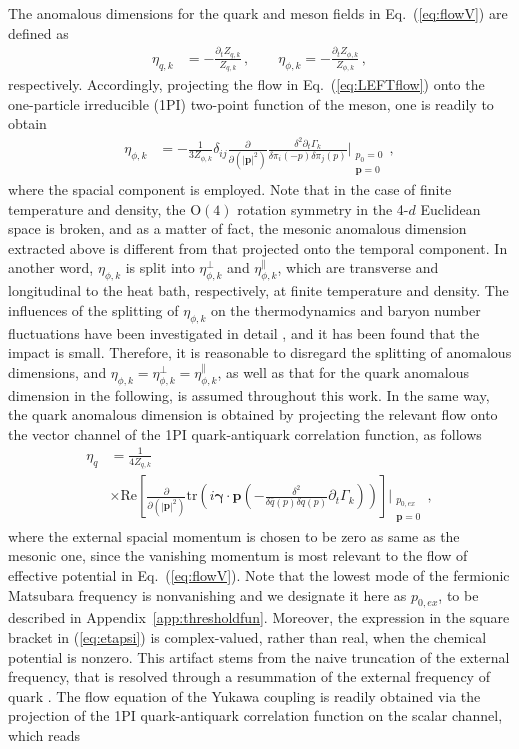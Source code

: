 \documentclass[%
reprint,
superscriptaddress,
showpacs,preprintnumbers,
 amsmath,amssymb,
 aps,
prd,
]{revtex4-1}
\def\Eq#1{Eq.~(\ref{#1})}
\def\eq#1{(\ref{#1})}
\def\app#1{Appendix~\ref{#1}}
\begin{document}
The anomalous dimensions for the quark and meson fields in \Eq{eq:flowV} are defined as
\begin{align}
 \eta_{q,k}&=-\frac{\partial_t Z_{q,k}}{Z_{q,k}}\,,\qquad
  \eta_{\phi,k}=-\frac{\partial_t Z_{\phi,k}}{Z_{\phi,k}}\,,
\end{align}
respectively. Accordingly, projecting the flow in \Eq{eq:LEFTflow} onto the one-particle irreducible (1PI) two-point function of the meson, one is readily to obtain 
\begin{align}
  \eta_{\phi,k}&=-\frac{1}{3Z_{\phi,k}}\delta_{ij}\frac{\partial}{\partial (|\bm{p}|^2)}\frac{\delta^2 \partial_t \Gamma_k}{\delta \pi_i(-p) \delta \pi_j(p)}\Bigg|_{\substack{p_0=0\\ \bm{p}=0}}\,,\label{eq:etaphi}
\end{align}
where the spacial component is employed. Note that in the case of finite temperature and density, the $\mathrm{O}(4)$ rotation symmetry in the 4-$d$ Euclidean space is broken, and as a matter of fact, the mesonic anomalous dimension extracted above is different from that projected onto the temporal component. In another word, $\eta_{\phi,k}$ is split into $\eta_{\phi,k}^{\perp}$ and $\eta_{\phi,k}^{\parallel}$, which are transverse and longitudinal to the heat bath, respectively, at finite temperature and density. The influences of the splitting of $\eta_{\phi,k}$ on the thermodynamics and baryon number fluctuations have been investigated in detail \cite{Yin:2019ebz}, and it has been found that the impact is small. Therefore, it is reasonable to disregard the splitting of anomalous dimensions, and $\eta_{\phi,k}=\eta_{\phi,k}^{\perp}=\eta_{\phi,k}^{\parallel}$, as well as that for the quark anomalous dimension in the following, is assumed throughout this work. In the same way, the quark anomalous dimension is obtained by projecting the relevant flow onto the vector channel of the 1PI quark-antiquark correlation function, as follows
\begin{align}
  \eta_{q}&=\frac{1}{4 Z_{q,k}}\nonumber\\[2ex]
&\times\mathrm{Re}\left[\frac{\partial}{\partial (|\bm{p}|^2)}\mathrm{tr}
            \left(i \bm{\gamma}\cdot\bm{p}\left(-\frac{\delta^2}{\delta\bar{q}(p)
            \delta q(p)}\partial_t \Gamma_k\right)\right)\right]\Bigg|_{\substack{p_{0,ex}\\ \bm{p}=0}}\,,  \label{eq:etapsi}
\end{align}
where the external spacial momentum is chosen to be zero as same as the mesonic one, since the vanishing momentum is most relevant to the flow of effective potential in \Eq{eq:flowV}. Note that the lowest mode of the fermionic Matsubara frequency is nonvanishing and we designate it here as $p_{0,ex}$, to be described in \app{app:thresholdfun}. Moreover, the expression in the square bracket in \eq{eq:etapsi} is complex-valued, rather than real, when the chemical potential is nonzero. This artifact stems from the naive truncation of the external frequency, that is resolved through a resummation of the external frequency of quark  \cite{Fu:2016tey}. The flow equation of the Yukawa coupling is readily obtained via the projection of the 1PI quark-antiquark correlation function on the scalar channel, which reads
\end{document}
